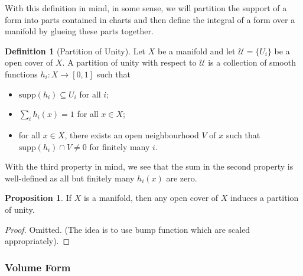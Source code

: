 \documentclass[]{article}
\theoremstyle{definition}
\theoremstyle{definition}
\newtheorem{definition}{Definition}[section]
\newtheorem{proposition}{Proposition}[section]
\begin{document}
With this definition in mind, in some sense, we will partition the support of a 
form into parts contained in charts and then define the integral of a form over 
a manifold by glueing these parts together.

\begin{definition}[Partition of Unity]
  Let \(X\) be a manifold and let \(\mathcal{U} = \{U_i\}\) be a open cover of 
  \(X\). A partition of unity with respect to \(\mathcal{U}\) is a collection of 
  smooth functions \(h_i : X \to [0, 1]\) such that 
  \begin{itemize}
    \item \(\text{supp}(h_i) \subseteq U_i\) for all \(i\);
    \item \(\sum_i h_i(x) = 1\) for all \(x \in X\);
    \item for all \(x \in X\), there exists an open neighbourhood \(V\) of \(x\) 
      such that \(\text{supp}(h_i) \cap V \neq 0\) for finitely many \(i\).
  \end{itemize}
  With the third property in mind, we see that the sum in the second property is 
  well-defined as all but finitely many \(h_i(x)\) are zero.
\end{definition}

\begin{proposition}
  If \(X\) is a manifold, then any open cover of \(X\) induces a partition of 
  unity.
\end{proposition}
\begin{proof}
  Omitted. (The idea is to use bump function which are scaled appropriately).
\end{proof}

\subsubsection{Volume Form}
\end{document}
